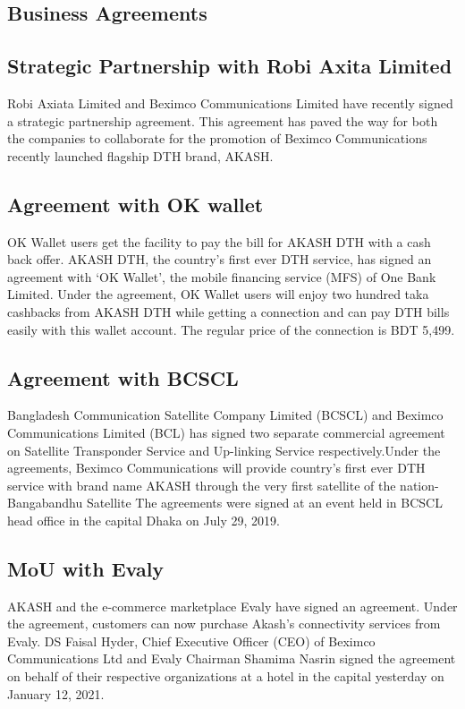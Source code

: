 \begin{spacing}{1.5}
\section{Business Agreements}
\subsection{Strategic Partnership with Robi Axita Limited}
Robi Axiata Limited and Beximco Communications Limited have recently signed a strategic partnership agreement. This agreement has paved the way for both the companies to collaborate for the promotion of Beximco Communications recently launched flagship DTH brand, AKASH.
\subsection{Agreement with OK wallet}
OK Wallet users get the facility to pay the bill for AKASH DTH with a cash back offer. AKASH DTH, the country's first ever DTH service, has signed an agreement with ‘OK Wallet’, the mobile financing service (MFS) of One Bank Limited. Under the agreement, OK Wallet users will enjoy two hundred taka cashbacks from AKASH DTH while getting a connection and can pay DTH bills easily with this wallet account. The regular price of the connection is BDT 5,499.
\subsection{Agreement with BCSCL}
Bangladesh Communication Satellite Company Limited (BCSCL) and Beximco Communications Limited (BCL) has signed two separate commercial agreement on Satellite Transponder Service and Up-linking Service respectively.Under the agreements, Beximco Communications will provide country’s first ever DTH service with brand name AKASH through the very first satellite of the nation- Bangabandhu Satellite The agreements were signed at an event held in BCSCL head office in the capital Dhaka on July 29, 2019.
\subsection{MoU with Evaly}
AKASH and the e-commerce marketplace Evaly have signed an agreement. Under the agreement, customers can now purchase Akash's connectivity services from Evaly. DS Faisal Hyder, Chief Executive Officer (CEO) of Beximco Communications Ltd and Evaly Chairman Shamima Nasrin signed the agreement on behalf of their respective organizations at a hotel in the capital yesterday on January 12, 2021.

\end{spacing}
